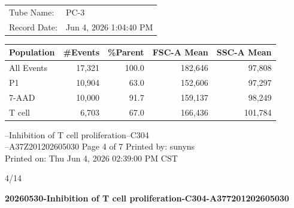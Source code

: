 \documentclass[UTF8,10pt,a4paper,fontset=fandol]{ctexart}
\newcommand{\handwritten}[1]{#1}
\begin{document}
\begin{center}
\begin{tabular}{|l|l|}
\hline
Tube Name: & PC-3\\
Record Date: & Jun 4, 2026 1:04:40 PM\\
\hline
\end{tabular}

\vspace{0.1cm}

\begin{tabular}{|l|r|r|r|r|}
\hline
Population & \#Events & \%Parent & FSC-A Mean & SSC-A Mean\\
\hline
All Events & 17,321 & 100.0 & 182,646 & 97,808\\
P1 & 10,904 & 63.0 & 152,606 & 97,297\\
7-AAD & 10,000 & 91.7 & 159,137 & 98,249\\
T cell & 6,703 & 67.0 & 166,436 & 101,784\\
\hline
\end{tabular}
\end{center}

\vfill

--Inhibition of T cell proliferation--C304\\
--A37Z201202605030
\hfill Page 4 of 7
\hfill Printed by: sunyns\\
\hfill Printed on: Thu Jun 4, 2026 02:39:00 PM CST

\vspace{0.2cm}

\hfill\handwritten{4/14}

\newpage

\begin{center}
\textbf{20260530-Inhibition of T cell proliferation-C304-A377201202605030}
\end{center}
\end{document}
